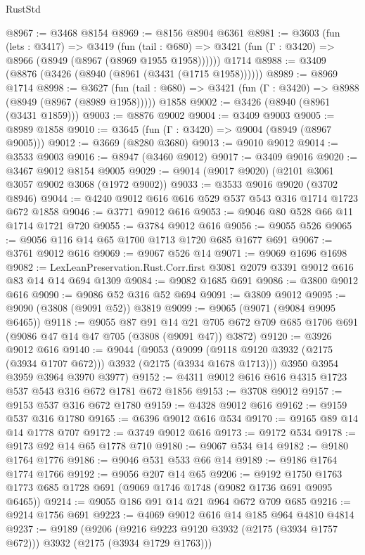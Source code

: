 \begin{lexlean}{RustStd}
\begin{coremodule}
@8967 := @3468 @8154
@8969 := @8156 @8904 @6361
@8981 := @3603
    (fun (lets : @3417) =>
    @3419
      (fun (tail : @680) => @3421 (fun (Γ : @3420) => @8966 (@8949 (@8967 (@8969 @1955 @1958))))))
    @1714
@8988 := @3409 (@8876 (@3426 (@8940 (@8961 (@3431 (@1715 @1958))))))
@8989 := @8969 @1714
@8998 := @3627
    (fun (tail : @680) => @3421 (fun (Γ : @3420) => @8988 (@8949 (@8967 (@8989 @1958)))))
    @1858
@9002 := @3426 (@8940 (@8961 (@3431 @1859)))
@9003 := @8876 @9002
@9004 := @3409 @9003
@9005 := @8989 @1858
@9010 := @3645 (fun (Γ : @3420) => @9004 (@8949 (@8967 @9005)))
@9012 := @3669 (@8280 @3680)
@9013 := @9010 @9012
@9014 := @3533 @9003
@9016 := @8947 (@3460 @9012)
@9017 := @3409 @9016
@9020 := @3467 @9012 @8154 @9005
@9029 := @9014 (@9017 @9020) (@2101 @3061 @3057 @9002 @3068 (@1972 @9002))
@9033 := @3533 @9016 @9020 (@3702 @8946)
@9044 := @4240 @9012 @616 @616 @529 @537 @543 @316 @1714 @1723 @672 @1858
@9046 := @3771 @9012 @616
@9053 := @9046 @80 @528 @66 @11 @1714 @1721 @720
@9055 := @3784 @9012 @616
@9056 := @9055 @526
@9065 := @9056 @116 @14 @65 @1700 @1713 @1720 @685 @1677 @691
@9067 := @3761 @9012 @616
@9069 := @9067 @526 @14
@9071 := @9069 @1696 @1698
@9082 := LexLeanPreservation.Rust.Corr.first @3081 @2079 @3391 @9012 @616 @83 @14 @14 @694 @1309
@9084 := @9082 @1685 @691
@9086 := @3800 @9012 @616
@9090 := @9086 @52 @316 @52 @694
@9091 := @3809 @9012
@9095 := @9090 (@3808 (@9091 @52)) @3819
@9099 := @9065 (@9071 (@9084 @9095 @6465))
@9118 := @9055
    @87
    @91
    @14
    @21
    @705
    @672
    @709
    @685
    @1706
    @691
    (@9086 @47 @14 @47 @705 (@3808 (@9091 @47)) @3872)
@9120 := @3926 @9012 @616
@9140 := @9044
    (@9053
      (@9099 (@9118 @9120 @3932 (@2175 (@3934 @1707 @672))) @3932 (@2175 (@3934 @1678 @1713)))
      @3950
      @3954
      @3959
      @3964
      @3970
      @3977)
@9152 := @4311 @9012 @616 @616 @4315 @1723 @537 @543 @316 @672 @1781 @672 @1856
@9153 := @3708 @9012
@9157 := @9153 @537 @316 @672 @1780
@9159 := @4328 @9012 @616
@9162 := @9159 @537 @316 @1780
@9165 := @6396 @9012 @616 @534
@9170 := @9165 @89 @14 @14 @1778 @707
@9172 := @3749 @9012 @616
@9173 := @9172 @534
@9178 := @9173 @92 @14 @65 @1778 @710
@9180 := @9067 @534 @14
@9182 := @9180 @1764 @1776
@9186 := @9046 @531 @533 @66 @14
@9189 := @9186 @1764 @1774 @1766
@9192 := @9056 @207 @14 @65
@9206 := @9192 @1750 @1763 @1773 @685 @1728 @691 (@9069 @1746 @1748 (@9082 @1736 @691 @9095 @6465))
@9214 := @9055 @186 @91 @14 @21 @964 @672 @709 @685
@9216 := @9214 @1756 @691
@9223 := @4069 @9012 @616 @14 @185 @964 @4810 @4814
@9237 := @9189
    (@9206 (@9216 @9223 @9120 @3932 (@2175 (@3934 @1757 @672))) @3932 (@2175 (@3934 @1729 @1763)))

\end{coremodule}
\end{lexlean}
